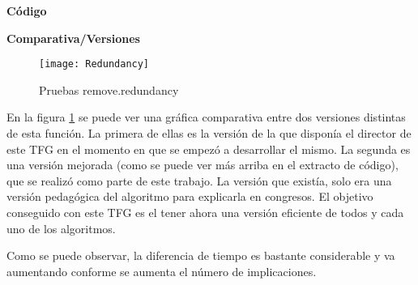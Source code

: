 \newpage
\textbf{C\'odigo} 

\newpage
 
\textbf{Comparativa/Versiones} 
\begin{figure}[h]
    \centering
    \texttt{[image: Redundancy]}
    \caption{Pruebas remove.redundancy}
    \label{fig:redundancy}
\end{figure} 

En la figura \ref{fig:redundancy} se puede ver una gr\'afica comparativa entre dos versiones distintas de esta funci\'on. La primera de ellas es la versi\'on de la que dispon\'ia el director de este TFG en el momento en que se empez\'o a desarrollar el mismo. La segunda es una versi\'on mejorada (como se puede ver m\'as arriba en el extracto de c\'odigo), que se realiz\'o como parte de este trabajo. La versi\'on que exist\'ia, solo era una versi\'on pedag\'ogica del algoritmo para explicarla en congresos. El objetivo conseguido con este TFG es el tener ahora una versi\'on eficiente de todos y cada uno de los algoritmos. 


Como se puede observar, la diferencia de tiempo es bastante considerable y va aumentando conforme se aumenta el n\'umero de implicaciones.